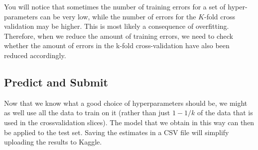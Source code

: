 \documentclass[11pt]{article}
\begin{document}
    You will notice that sometimes the number of training errors for a set
of hyper-parameters can be very low, while the number of errors for the
\(K\)-fold cross validation may be higher. This is most likely a
consequence of overfitting. Therefore, when we reduce the amount of
training errors, we need to check whether the amount of errors in the
k-fold cross-validation have also been reduced accordingly.

\hypertarget{predict-and-submit}{%
\subsection{Predict and Submit}\label{predict-and-submit}}

Now that we know what a good choice of hyperparameters should be, we
might as well use all the data to train on it (rather than just
\(1-1/k\) of the data that is used in the crossvalidation slices). The
model that we obtain in this way can then be applied to the test set.
Saving the estimates in a CSV file will simplify uploading the results
to Kaggle.
\end{document}
